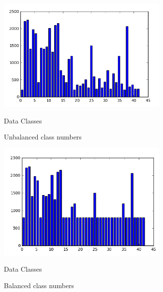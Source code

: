 \documentclass{article}
\begin{document}
\begin{figure}[htb]

\begin{minipage}[b]{1.0\linewidth}
  \centering
  \centerline{\includegraphics[width=8.5cm]{one.PNG}}
  \centerline{Data Classes}\medskip
\end{minipage}
%

\caption{Unbalanced class numbers}
\label{fig:res}
%

\begin{minipage}[b]{1.0\linewidth}
  \centering
  \centerline{\includegraphics[width=8.5cm]{two.PNG}}
  \centerline{ Data Classes}\medskip
\end{minipage}
%

\caption{Balanced class numbers}
\label{fig:res}
%

\end{figure}

\end{document}
